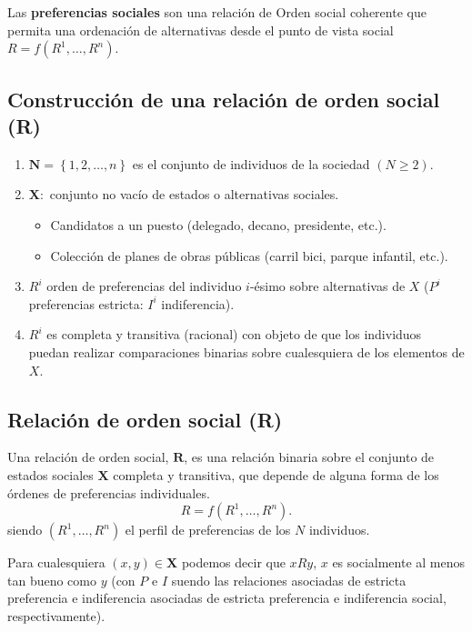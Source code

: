 Las \textbf{preferencias sociales} son una relación de Orden social coherente que permita una ordenación de alternativas desde el punto de vista social $R=f(R^1,\ldots,R^n)$.

\subsection{Construcción de una relación de orden social (R)}
\begin{enumerate}
    \item $\textbf{N}=\left\{1,2,\ldots,n\right\}$ es el conjunto de individuos de la sociedad $(N\geq 2)$.
    \item $\textbf{X}:$ conjunto no vacío de estados o alternativas sociales.
	\begin{itemize}
	    \item Candidatos a un puesto (delegado, decano, presidente, etc.).
	    \item Colección de planes de obras públicas (carril bici, parque infantil, etc.).
	\end{itemize}
    \item $R^i$ orden de preferencias del individuo $i$-ésimo sobre alternativas de $X$ ($P^i$ preferencias estricta: $I^i$ indiferencia).
    \item $R^i$ es completa y transitiva (racional) con objeto de que los individuos puedan realizar comparaciones binarias sobre cualesquiera de los elementos de $X$.
\end{enumerate}

\subsection{Relación de orden social (R)}

\begin{def.} Una relación de orden social, $\textbf{R}$, es una relación binaria sobre el conjunto de estados sociales $\textbf{X}$ completa y transitiva, que depende de alguna forma de los órdenes de preferencias individuales.
    $$R=f(R^1,\ldots,R^n).$$
    siendo $(R^1,\ldots,R^n)$ el perfil de preferencias de los $N$ individuos.
\end{def.}

Para cualesquiera $(x,y)\in \textbf{X}$ podemos decir que $xRy$, $x$ es socialmente al menos tan bueno como $y$ (con $P$ e $I$ suendo las relaciones asociadas de estricta preferencia e indiferencia asociadas de estricta preferencia e indiferencia social, respectivamente).

